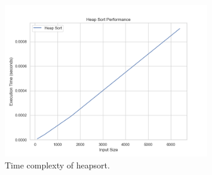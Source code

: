 \documentclass{article}
\begin{document}
\begin{figure}[h]
\centering
\includegraphics[width=0.8\textwidth]{../graph/heap_sort.png}
\caption{Time complexty of heapsort.}
\label{avg:best}
\end{figure}
\end{document}
